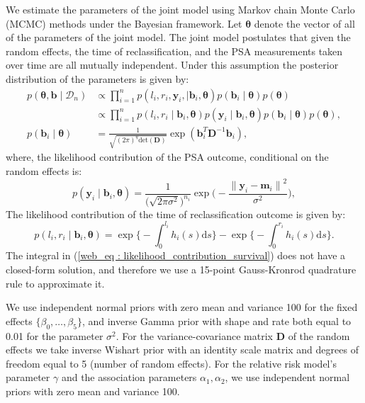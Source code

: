 We estimate the parameters of the joint model using Markov chain Monte Carlo (MCMC) methods under the Bayesian framework. Let $\boldsymbol{\theta}$ denote the vector of all of the parameters of the joint model. The joint model postulates that given the random effects, the time of reclassification, and the PSA measurements taken over time are all mutually independent. Under this assumption the posterior distribution of the parameters is given by:
\begin{align*}
p(\boldsymbol{\theta}, \boldsymbol{b} \mid \mathcal{D}_n) & \propto \prod_{i=1}^n p(l_i, r_i, \boldsymbol{y}_{i}, \mid \boldsymbol{b}_i, \boldsymbol{\theta}) p(\boldsymbol{b}_i \mid \boldsymbol{\theta}) p(\boldsymbol{\theta})\\
& \propto \prod_{i=1}^n p(l_i, r_i \mid \boldsymbol{b}_i, \boldsymbol{\theta}) p(\boldsymbol{y}_{i} \mid \boldsymbol{b}_i, \boldsymbol{\theta}) p(\boldsymbol{b}_i \mid \boldsymbol{\theta}) p(\boldsymbol{\theta}),\\
p(\boldsymbol{b}_i \mid \boldsymbol{\theta}) &= \frac{1}{\sqrt{(2 \pi)^q \text{det}(\boldsymbol{D})}} \exp(\boldsymbol{b}_i^T \boldsymbol{D}^{-1} \boldsymbol{b}_i),
\end{align*}
where, the likelihood contribution of the PSA outcome, conditional on the random effects is:
\begin{equation*}
p(\boldsymbol{y}_{i} \mid \boldsymbol{b}_i, \boldsymbol{\theta}) = \frac{1}{\big(\sqrt{2 \pi \sigma^2}\big)^{n_{i}}} \exp\bigg(-\frac{{\lVert{\boldsymbol{y}_{i} - \boldsymbol{m}_{i}}\rVert}^2}{\sigma^2}\bigg),
\end{equation*}
The likelihood contribution of the time of reclassification outcome is given by:
\begin{equation}
\label{web_eq : likelihood_contribution_survival}
p(l_i,r_i\mid \boldsymbol{b}_i,\boldsymbol{\theta}) = \exp\Big\{-\int_0^{l_i} h_i(s)\mathrm{d}{s}\Big\} - \exp\Big\{-\int_0^{r_i}h_i(s)\mathrm{d}{s}\Big\}.
\end{equation}
The integral in (\ref{web_eq : likelihood_contribution_survival}) does not have a closed-form solution, and therefore we use a 15-point Gauss-Kronrod quadrature rule to approximate it.

We use independent normal priors with zero mean and variance 100 for the fixed effects $\{\beta_{0},\ldots,\beta_{5}\}$, and inverse Gamma prior with shape and rate both equal to 0.01 for the parameter $\sigma^2$. For the variance-covariance matrix $\boldsymbol{D}$ of the random effects we take inverse Wishart prior with an identity scale matrix and degrees of freedom equal to 5 (number of random effects). For the relative risk model's parameter $\gamma$ and the association parameters $\alpha_{1}, \alpha_{2}$, we use independent normal priors with zero mean and variance 100.

